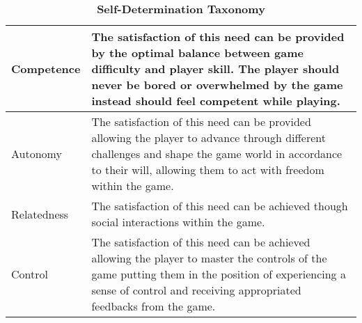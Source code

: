 \begin{table}[h]
\caption{\textbf{Self-Determination Taxonomy}}
\label{deci}
\begin{tabularx}{\textwidth}{|l|X|}
\hline
Competence  & The satisfaction of this need can be provided by the optimal balance between game difficulty and player skill. The player should never be bored or overwhelmed by the game instead should feel competent while playing.  \\ \hline
Autonomy    & The satisfaction of this need can be provided allowing the player to advance through different challenges and shape the game world in accordance to their will, allowing them to act with freedom within the game.       \\ \hline
Relatedness & The satisfaction of this need can be achieved though social interactions within the game.                                                                                                                                \\ \hline
Control     & The satisfaction of this need can be achieved allowing the player to master the controls of the game putting them in the position of experiencing a sense of control and receiving appropriated feedbacks from the game. \\ \hline
\end{tabularx}
\end{table}